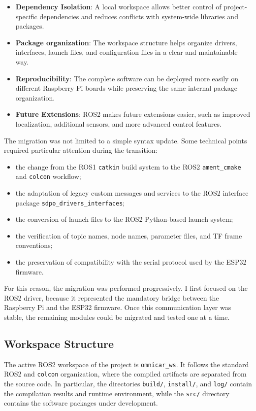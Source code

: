   \begin{itemize}
      \item \textbf{Dependency Isolation}: A local workspace allows better control
  of project-specific dependencies and reduces conflicts with system-wide
  libraries and packages.
      \item \textbf{Package organization}: The workspace structure helps organize drivers,
  interfaces, launch files, and configuration files in a clear and maintainable
  way.
      \item \textbf{Reproducibility}: The complete software can be deployed more
  easily on different Raspberry Pi boards while preserving the same internal
  package organization.
      \item \textbf{Future Extensions}: ROS2 makes future extensions easier, such as
  improved localization, additional sensors, and more advanced control features.
  \end{itemize}

  The migration was not limited to a simple syntax update. Some technical points
  required particular attention during the transition:

  \begin{itemize}
      \item the change from the ROS1 \texttt{catkin} build system to the ROS2
  \texttt{ament\_cmake} and \texttt{colcon} workflow;
      \item the adaptation of legacy custom messages and services to the ROS2
  interface package \texttt{sdpo\_drivers\_interfaces};
      \item the conversion of launch files to the ROS2 Python-based launch system;
      \item the verification of topic names, node names, parameter files, and TF
  frame conventions;
      \item the preservation of compatibility with the serial protocol used by the
  ESP32 firmware.
  \end{itemize}

  For this reason, the migration was performed progressively. I first focused on the ROS2 driver, because it represented the mandatory bridge between the Raspberry Pi and the ESP32 firmware. Once this communication layer was stable, the remaining modules could be migrated and tested one at a time.

  \subsection{Workspace Structure}
  The active ROS2 workspace of the project is \texttt{omnicar\_ws}. It follows the
  standard ROS2 and \texttt{colcon} organization, where the compiled artifacts are
  separated from the source code. In particular, the directories \texttt{build/},
  \texttt{install/}, and \texttt{log/} contain the compilation results and runtime
  environment, while the \texttt{src/} directory contains the software packages
  under development.

